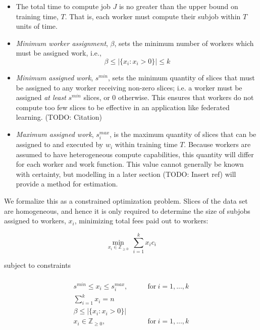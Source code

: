 \documentclass[../mthe-493-final-project.tex]{subfiles}
\begin{document}
    \begin{itemize}
        \item The total time to compute job $J$ is no greater than the upper bound on training time, $T$. That is, each worker must compute their subjob within $T$ units of time.
        \item \textit{Minimum worker assignment}, $\beta$, sets the minimum number of workers which must be assigned work, i.e.,
            \[\beta \leq \vert \{x_i : x_i > 0\} \vert \leq k\]
        \item \textit{Minimum assigned work}, $s^{min}$, sets the minimum quantity of slices that must be assigned to any worker receiving non-zero slices; i.e. a worker must be assigned \textit{at least} $s^{min}$ slices, or 0 otherwise. This ensures that workers do not compute too few slices to be effective in an application like federated learning. (TODO: Citation)
        \item \textit{Maximum assigned work}, $s^{max}_i$, is the maximum quantity of slices that can be assigned to and executed by $w_i$ within training time $T$. Because workers are assumed to have heterogeneous compute capabilities, this quantity will differ for each worker and work function. This value cannot generally be known with certainty, but modelling in a later section (TODO: Insert ref) will provide a method for estimation.
    \end{itemize}
    
    
    We formalize this as a constrained optimization problem. Slices of the data set are homogeneous, and hence it is only required to determine the size of subjobs assigned to workers, $x_i$, minimizing total fees paid out to workers:
    
    \[ \min_{x_i \in \mathbb{Z}_{\geq 0}} \ \sum_{i=1}^k x_i c_i \]
    
    subject to constraints
    
    \begin{align*}
         \\
        s^{min} \leq x_i \leq s^{max}_i, & \qquad \text{for} \ i=1,...,k \\
        \sum_{i = 1}^k x_i = n \\
        \beta \leq \vert \{x_i : x_i > 0\} \vert \\
        x_i \in \mathbb{Z}_{\geq 0}, & \qquad \text{for} \ i=1,...,k 
    \end{align*}
    
\end{document}
